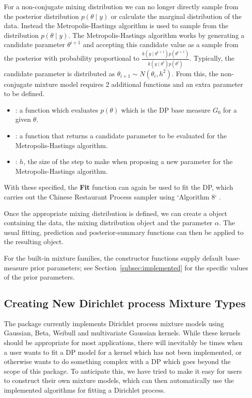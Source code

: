 \documentclass[nojss]{jss}
\begin{document}
For a non-conjugate mixing distribution we can no longer directly sample from the posterior distribution $p(\theta \mid y)$ or calculate the marginal distribution of the data. Instead the Metropolis-Hastings algorithm is used to sample from the distribution $p(\theta \mid y)$. The Metropolis-Hastings algorithm works by generating a candidate parameter $\theta ^{i+1}$ and accepting this candidate value as a sample from the posterior with probability proportional to $\frac{k(y \mid \theta ^{i+1}) p(\theta ^{i+1})}{k(y \mid \theta^i) p(\theta^i)}$. Typically, the candidate parameter is distributed as $\theta _{i+1} \sim N(\theta _i, h^2)$. From this, the non-conjugate mixture model requires 2 additional functions and an extra parameter to be defined.
\begin{itemize}
\item {}: a function which evaluates $p(\theta)$ which is the DP base measure $G_0$ for a given $\theta$.
\item {}: a function that returns a candidate parameter to be evaluated for the Metropolis-Hastings algorithm.
\item {}: $h$, the size of the step to make when proposing a new parameter for the Metropolis-Hastings algorithm.
\end{itemize}

With these specified, the \textbf{Fit} function can again be used to fit the DP, which carries out the Chinese Restaurant Process sampler using `Algorithm 8` \citep{neal_markov_2000}.

Once the appropriate mixing distribution is defined, we can create a  object containing the data, the mixing distribution object and the parameter $\alpha$. The usual fitting, prediction and posterior-summary functions can then be applied to the resulting object.

For the built-in mixture families, the constructor functions supply default base-measure prior parameters; see Section~\ref{subsec:implemented} for the specific values of the prior parameters.

\subsection{Creating New Dirichlet process Mixture Types} \label{sec:NewMDobj}
The  package currently implements Dirichlet process mixture models using Gaussian, Beta, Weibull and multivariate Gaussian kernels. While these kernels should be appropriate for most applications, there will inevitably be times when a user wants to fit a DP model for a kernel which has not been implemented, or otherwise wants to do something complex with a DP which goes beyond the scope of this package. To anticipate this, we have tried to make it easy for users to construct their own mixture models, which can then automatically use the implemented algorithms for fitting a Dirichlet process.
\end{document}
